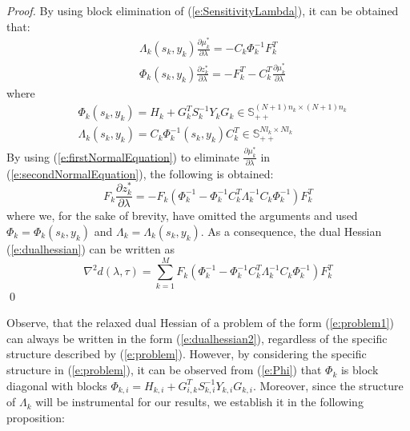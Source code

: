 \begin{proof}
By using block elimination of (\ref{e:SensitivityLambda}), it can be obtained that:
\begin{subequations}
\begin{align}
& \Lambda_k (s_k, y_k) \frac{\partial \mu_k^*}{\partial \lambda} = -C_k \Phi_k^{-1} F_k^T \label{e:firstNormalEquation} \\
& \Phi_k (s_k, y_k) \frac{\partial z_k^*}{\partial \lambda} = -F_k^T - C_k^T \frac{\partial \mu_k^*}{\partial \lambda} \label{e:secondNormalEquation}
\end{align}
\end{subequations}
where
\begin{subequations}
\begin{align}
& \Phi_k (s_k, y_k) = H_k + G_k^T S_k^{-1} Y_k G_k \in \mathbb{S}_{++}^{(N+1)n_k \times (N+1)n_k} \\
& \Lambda_k (s_k, y_k) = C_k \Phi_k^{-1}(s_k, y_k) C_k^{T} \in \mathbb{S}_{++}^{N l_k \times N l_k} \label{e:Lambda}
\end{align}
\end{subequations}
By using (\ref{e:firstNormalEquation}) to eliminate $\frac{\partial \mu_k^*}{\partial \lambda}$ in (\ref{e:secondNormalEquation}), the following is obtained:
\begin{equation}
\label{e:localcontributions}
F_k \frac{\partial z_k^*}{\partial \lambda} = -F_k (\Phi_k^{-1} - \Phi_k^{-1} C_k^T \Lambda_k^{-1} C_k \Phi_k^{-1}) F_k^T
\end{equation}
where we, for the sake of brevity, have omitted the arguments and used $\Phi_k = \Phi_k(s_k, y_k)$ and $\Lambda_k = \Lambda_k (s_k, y_k)$. As a consequence, the dual Hessian (\ref{e:dualhessian}) can be written as
\begin{equation}
\nabla^2 d(\lambda, \tau) = \sum_{k=1}^M F_k (\Phi_k^{-1} - \Phi_k^{-1} C_k^T \Lambda_k^{-1} C_k \Phi_k^{-1}) F_k^T
\end{equation}
\qed
\end{proof}
Observe, that the relaxed dual Hessian of a problem of the form (\ref{e:problem1}) can always be written in the form (\ref{e:dualhessian2}), regardless of the specific structure described by (\ref{e:problem}). However, by considering the specific structure in (\ref{e:problem}), it can be observed from (\ref{e:Phi}) that $\Phi_k$ is block diagonal with blocks $\Phi_{k,i} = H_{k,i} + G_{i,k}^T S_{k,i}^{-1} Y_{k,i} G_{k,i}$. Moreover, since the structure of $\Lambda_k$ will be instrumental for our results, we establish it in the following proposition:
